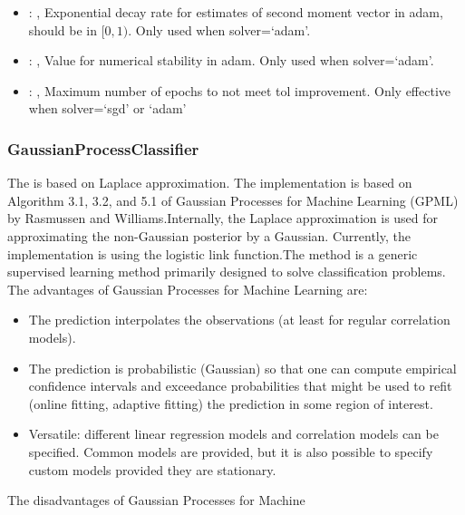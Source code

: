 \begin{itemize}
    \item {}: , 
      Exponential decay rate for estimates of second moment vector in adam, should be in $[0, 1)$.
      Only used when solver=`adam'.

    \item {}: , 
      Value for numerical stability in adam. Only used when solver=`adam'.

    \item {}: , 
      Maximum number of epochs to not meet tol improvement. Only effective when
      solver=`sgd' or `adam'
  \end{itemize}


\subsubsection{GaussianProcessClassifier}
  The  is based on Laplace approximation. The implementation
  is based on Algorithm 3.1, 3.2, and 5.1 of Gaussian Processes for Machine Learning (GPML) by
  Rasmussen and Williams.Internally, the Laplace approximation is used for approximating the
  non-Gaussian posterior by a Gaussian. Currently, the implementation is using the
  logistic link function.The method is a generic supervised learning                          method
  primarily designed to solve classification problems.                          The advantages of
  Gaussian Processes for Machine Learning are:                          \begin{itemize}
  \item The prediction interpolates the observations (at least for regular
  correlation models).                            \item The prediction is probabilistic (Gaussian)
  so that one can compute                            empirical confidence intervals and exceedance
  probabilities that might be used                            to refit (online fitting, adaptive
  fitting) the prediction in some region of                            interest.
  \item Versatile: different linear regression models and correlation models can
  be specified.                            Common models are provided, but it is also possible to
  specify custom models                            provided they are stationary.
  \end{itemize}                          The disadvantages of Gaussian Processes for Machine
